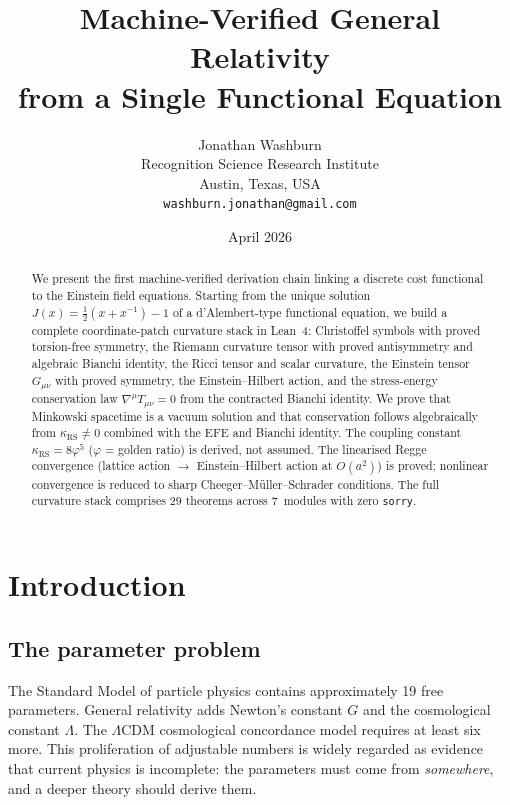 \documentclass[11pt,a4paper]{article}
\title{\textbf{Machine-Verified General Relativity\\from a Single Functional Equation}}
\author{Jonathan Washburn\\
Recognition Science Research Institute\\
Austin, Texas, USA\\
\texttt{washburn.jonathan@gmail.com}}
\date{April 2026}
\newcommand{\vp}{\varphi}
\newcommand{\kRS}{\kappa_{\mathrm{RS}}}
\newcommand{\Jcost}{J}
\begin{document}
\maketitle

\begin{abstract}
We present the first machine-verified derivation chain linking a discrete cost functional to the Einstein field equations.
Starting from the unique solution $\Jcost(x) = \tfrac{1}{2}(x + x^{-1}) - 1$ of a d'Alembert-type functional equation, we build a complete coordinate-patch curvature stack in Lean~4: Christoffel symbols with proved torsion-free symmetry, the Riemann curvature tensor with proved antisymmetry and algebraic Bianchi identity, the Ricci tensor and scalar curvature, the Einstein tensor $G_{\mu\nu}$ with proved symmetry, the Einstein--Hilbert action, and the stress-energy conservation law $\nabla^\mu T_{\mu\nu} = 0$ from the contracted Bianchi identity.
We prove that Minkowski spacetime is a vacuum solution and that conservation follows algebraically from $\kRS \neq 0$ combined with the EFE and Bianchi identity.
The coupling constant $\kRS = 8\vp^5$ ($\vp$ = golden ratio) is derived, not assumed.
The linearised Regge convergence (lattice action $\to$ Einstein--Hilbert action at $O(a^2)$) is proved; nonlinear convergence is reduced to sharp Cheeger--M\"uller--Schrader conditions.
The full curvature stack comprises 29 theorems across 7~modules with zero \texttt{sorry}.
\end{abstract}

\tableofcontents
\newpage

\section{Introduction}
\label{sec:intro}

\subsection{The parameter problem}

The Standard Model of particle physics contains approximately 19 free parameters.
General relativity adds Newton's constant $G$ and the cosmological constant $\Lambda$.
The $\Lambda$CDM cosmological concordance model requires at least six more.
This proliferation of adjustable numbers is widely regarded as evidence that current physics is incomplete: the parameters must come from \emph{somewhere}, and a deeper theory should derive them.
\end{document}
